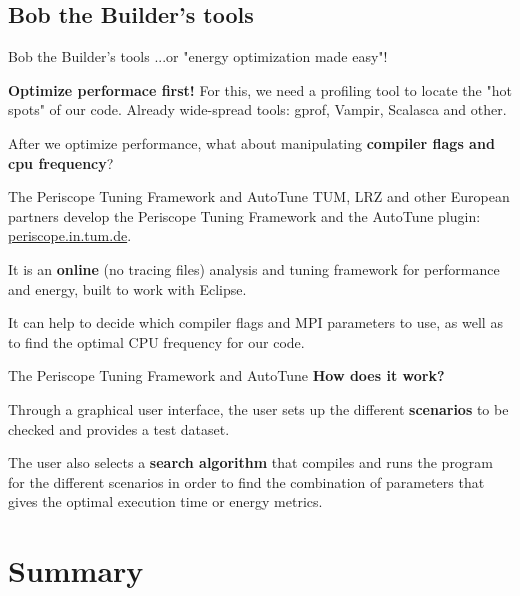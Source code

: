 \documentclass[10pt, compress]{beamer}
\begin{document}
\subsection{Bob the Builder's tools}

\begin{frame}[fragile]{Bob the Builder's tools}
...or "energy optimization made easy"!

\textbf{Optimize performace first!} For this, we need a profiling tool
to locate the "hot spots" of our code. Already wide-spread tools: gprof, Vampir, Scalasca and other.

\pause

After we optimize performance, what about manipulating \textbf{compiler flags and cpu frequency}?
\end{frame}

\begin{frame}[fragile]{The Periscope Tuning Framework and AutoTune}
TUM, LRZ and other European partners develop the \alert{Periscope Tuning Framework} and the \alert{AutoTune} plugin: \href{http://periscope.in.tum.de/}{periscope.in.tum.de}.

It is an \textbf{online} (no tracing files) analysis and tuning framework for performance and energy, built
to work with Eclipse.

It can help to decide which compiler flags and MPI parameters to use, as well as to find the
optimal CPU frequency for our code.
\end{frame}

\begin{frame}[fragile]{The Periscope Tuning Framework and AutoTune}
\textbf{How does it work?}

Through a graphical user interface, the user sets up the different \textbf{scenarios} to be checked
and provides a test dataset.

The user also selects a \textbf{search algorithm} that compiles and runs the program for the different scenarios in order to find the combination of parameters that gives the optimal execution time or energy metrics.
\end{frame}

\section{Summary}
\end{document}
